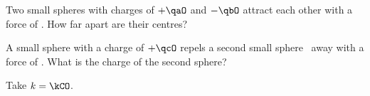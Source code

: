\begin{abcliste}
\abc Two small spheres with charges of $+\qaO$ and $-\qbO$ attract each other with a force of \FaO. How far apart are their centres?

\abc A small sphere with a charge of $+\qcO$ repels a second small sphere \rbO\ away with a force of \FbO. What is the charge of the second sphere?
\end{abcliste}

Take $k = \kCO$.
